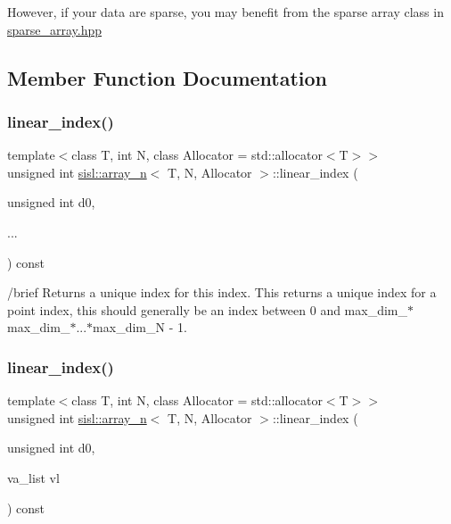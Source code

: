 However, if your data are sparse, you may benefit from the sparse array class in \hyperlink{sparse__array_8hpp_source}{sparse\+\_\+array.\+hpp} 

\subsection{Member Function Documentation}
\mbox{\label{classsisl_1_1array__n_a89f13ba676e526aa5ed2814514685dc0}} 
\subsubsection{\texorpdfstring{linear\+\_\+index()}{linear\_index()}\hspace{0.1cm}{\footnotesize\ttfamily [1/3]}}
{\footnotesize\ttfamily template$<$class T, int N, class Allocator = std\+::allocator$<$\+T$>$$>$ \\
unsigned int \hyperlink{classsisl_1_1array__n}{sisl\+::array\+\_\+n}$<$ T, N, Allocator $>$\+::linear\+\_\+index (\begin{DoxyParamCaption}\item[{unsigned int}]{d0,  }\item[{}]{... }\end{DoxyParamCaption}) const\hspace{0.3cm}{\ttfamily [inline]}}

/brief Returns a unique index for this index. This returns a unique index for a point index, this should generally be an index between 0 and max\+\_\+dim\+\_$\ast$max\+\_\+dim\+\_$\ast$...$\ast$max\+\_\+dim\+\_\+N -\/ 1. \mbox{\label{classsisl_1_1array__n_ad10bc825e1ab2bce68b9da0f98be3f1b}} 
\subsubsection{\texorpdfstring{linear\+\_\+index()}{linear\_index()}\hspace{0.1cm}{\footnotesize\ttfamily [2/3]}}
{\footnotesize\ttfamily template$<$class T, int N, class Allocator = std\+::allocator$<$\+T$>$$>$ \\
unsigned int \hyperlink{classsisl_1_1array__n}{sisl\+::array\+\_\+n}$<$ T, N, Allocator $>$\+::linear\+\_\+index (\begin{DoxyParamCaption}\item[{unsigned int}]{d0,  }\item[{va\+\_\+list}]{vl }\end{DoxyParamCaption}) const\hspace{0.3cm}{\ttfamily [inline]}}

